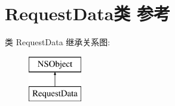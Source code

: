 \hypertarget{interface_request_data}{}\section{Request\+Data类 参考}
\label{interface_request_data}
类 Request\+Data 继承关系图\+:\begin{figure}[H]
\begin{center}
\leavevmode
\includegraphics[height=2.000000cm]{interface_request_data}
\end{center}
\end{figure}
